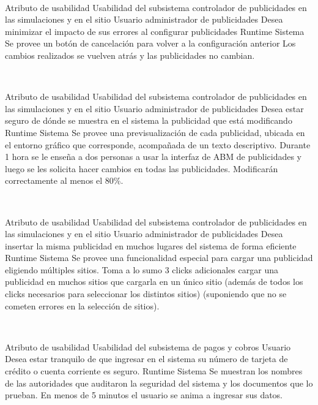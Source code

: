 ~

\escenario
{Atributo de usabilidad}
{Usabilidad del subsistema controlador de publicidades en las simulaciones y en el sitio}
{Usuario administrador de publicidades}
{Desea minimizar el impacto de sus errores al configurar publicidades}
{Runtime}
{Sistema}
{Se provee un botón de cancelación para volver a la configuración anterior}
{Los cambios realizados se vuelven atrás y las publicidades no cambian.}	

~

\escenario
{Atributo de usabilidad}
{Usabilidad del subsistema controlador de publicidades en las simulaciones y en el sitio}
{Usuario administrador de publicidades}
{Desea estar seguro de dónde se muestra en el sistema la publicidad que está modificando}
{Runtime}
{Sistema}
{Se provee una previsualización de cada publicidad, ubicada en el entorno gráfico que corresponde, acompañada de un texto descriptivo.}
{Durante 1 hora se le enseña a dos personas a usar la interfaz de ABM de publicidades y luego se les solicita hacer cambios en todas las publicidades. Modificarán correctamente al menos el 80\%.}

~

\escenario
{Atributo de usabilidad}
{Usabilidad del subsistema controlador de publicidades en las simulaciones y en el sitio}
{Usuario administrador de publicidades}
{Desea insertar la misma publicidad en muchos lugares del sistema de forma eficiente}
{Runtime}
{Sistema}
{Se provee una funcionalidad especial para cargar una publicidad eligiendo múltiples sitios.}
{Toma a lo sumo 3 clicks adicionales cargar una publicidad en muchos sitios que cargarla en un único sitio (además de todos los clicks necesarios para seleccionar los distintos sitios) (suponiendo que no se cometen errores en la selección de sitios).}

~

\escenario
{Atributo de usabilidad}
{Usabilidad del subsistema de pagos y cobros}
{Usuario}
{Desea estar tranquilo de que ingresar en el sistema su número de tarjeta de crédito o cuenta corriente es seguro.}
{Runtime}
{Sistema}
{Se muestran los nombres de las autoridades que auditaron la seguridad del sistema y los documentos que lo prueban.}
{En menos de 5 minutos el usuario se anima a ingresar sus datos.	}





